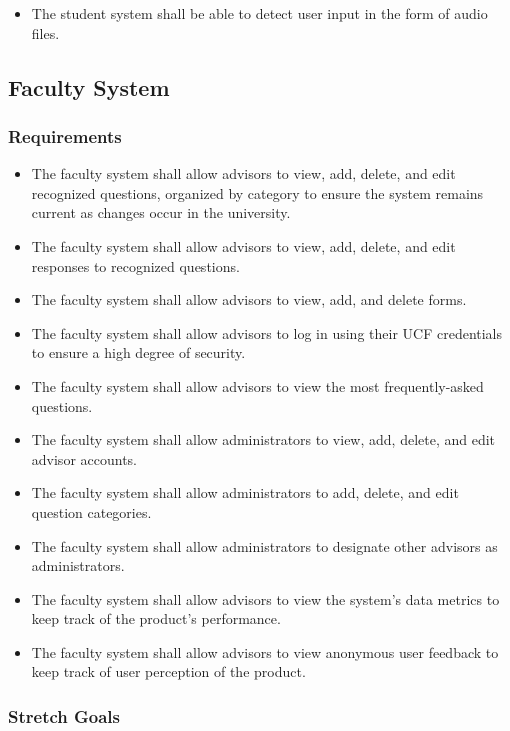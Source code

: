 \documentclass[titlepage, 12pt]{article}
\begin{document}
\begin{itemize}
    \item The student system shall be able to detect user input in the form of audio files.
\end{itemize}

\subsection{Faculty System}

\subsubsection{Requirements}

\begin{itemize}
    \item The faculty system shall allow advisors to view, add, delete, and edit recognized questions, organized by category to ensure the system remains current as changes occur in the university.
    \item The faculty system shall allow advisors to view, add, delete, and edit responses to recognized questions.
    \item The faculty system shall allow advisors to view, add, and delete forms.
    \item The faculty system shall allow advisors to log in using their UCF credentials to ensure a high degree of security.
    \item The faculty system shall allow advisors to view the most frequently-asked questions.
    \item The faculty system shall allow administrators to view, add, delete, and edit advisor accounts.
    \item The faculty system shall allow administrators to add, delete, and edit question categories.
    \item The faculty system shall allow administrators to designate other advisors as administrators.
    \item The faculty system shall allow advisors to view the system’s data metrics to keep track of the product's performance.
    \item The faculty system shall allow advisors to view anonymous user feedback to keep track of user perception of the product.
\end{itemize}

\subsubsection{Stretch Goals}
\end{document}
